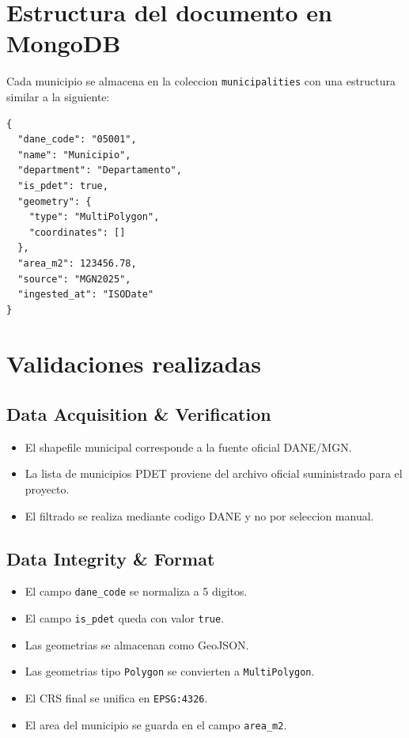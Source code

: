 \documentclass[12pt]{article}
\begin{document}
\section{Estructura del documento en MongoDB}

Cada municipio se almacena en la coleccion \texttt{municipalities} con una estructura similar a la siguiente:

\begin{lstlisting}[style=basicstyle,language={} ]
{
  "dane_code": "05001",
  "name": "Municipio",
  "department": "Departamento",
  "is_pdet": true,
  "geometry": {
    "type": "MultiPolygon",
    "coordinates": []
  },
  "area_m2": 123456.78,
  "source": "MGN2025",
  "ingested_at": "ISODate"
}
\end{lstlisting}

\section{Validaciones realizadas}

\subsection{Data Acquisition \& Verification}

\begin{itemize}[leftmargin=*]
    \item El shapefile municipal corresponde a la fuente oficial DANE/MGN.
    \item La lista de municipios PDET proviene del archivo oficial suministrado para el proyecto.
    \item El filtrado se realiza mediante codigo DANE y no por seleccion manual.
\end{itemize}

\subsection{Data Integrity \& Format}

\begin{itemize}[leftmargin=*]
    \item El campo \texttt{dane\_code} se normaliza a 5 digitos.
    \item El campo \texttt{is\_pdet} queda con valor \texttt{true}.
    \item Las geometrias se almacenan como GeoJSON.
    \item Las geometrias tipo \texttt{Polygon} se convierten a \texttt{MultiPolygon}.
    \item El CRS final se unifica en \texttt{EPSG:4326}.
    \item El area del municipio se guarda en el campo \texttt{area\_m2}.
\end{itemize}
\end{document}
